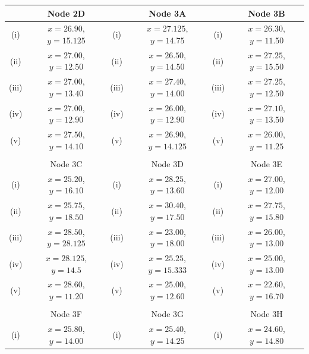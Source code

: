 \documentclass[12pt]{article}
\begin{document}
								\begin{tabular}{||c|c||c|c||c|c||}
								
					
					\hline  & Node 2D &   & Node 3A &  & Node 3B   \\  \hline
					\hline (i) & $x= 26.90$, $y= 15.125$ &  (i) & $x= 27.125$, $y= 14.75$  & (i)  & $x= 26.30$, $y= 11.50$\\  \hline
					\hline (ii)  & $x= 27.00$, $y= 12.50$  &  (ii) & $x= 26.50$, $y= 14.50$ & (ii) & $x= 27.25$, $y = 15.50$ \\  \hline
					\hline (iii) & $x= 27.00$, $y = 13.40$  & (iii) & $x= 27.40$, $y =14.00 $ &(iii) & $x= 27.25$, $y= 12.50$ \\  \hline
					\hline (iv)  & $x= 27.00$, $y= 12.90$  & (iv) & $x= 26.00$, $y = 12.90$ & (iv)  & $x= 27.10$, $y= 13.50$\\  \hline
					\hline (v) & $x= 27.50$, $y= 14.10$ & (v) & $x= 26.90$, $y= 14.125 $  &(v) & $x= 26.00$, $y= 11.25$\\  \hline & & & & & \\
					\hline 
					\hline  & Node 3C &   & Node 3D &  & Node 3E  \\  \hline
					\hline (i) & $x= 25.20$, $y = 16.10$ &  (i) & $x= 28.25$, $y = 13.60$  & (i)  & $x= 27.00$, $y = 12.00$\\  \hline
					\hline (ii) & $x= 25.75$, $y= 18.50$  & (ii) & $x= 30.40$, $y =17.50 $ &(ii) & $x= 27.75$, $y = 15.80$ \\  \hline
					\hline (iii)  & $x= 28.50$, $y= 28.125$  & (iii) & $x= 23.00$, $y = 18.00$ & (iii)  & $x= 26.00$, $y = 13.00$\\  \hline
					\hline (iv)  & $x= 28.125$, $y= 14.5$  &  (iv) & $x= 25.25$, $y = 15.333$ & (iv) & $x= 25.00$, $y = 13.00$ \\  \hline
					\hline (v) & $x= 28.60$, $y= 11.20$ & (v) & $x= 25.00 $, $y = 12.60$  &(v) & $x= 22.60$, $y = 16.70$\\  \hline & & & & & \\
					\hline 
					\hline  &  Node 3F &  & Node 3G &   & Node 3H \\  \hline
					\hline (i) & $x= 25.80$, $y= 14.00$ & (i) & $x= 25.40$, $y = 14.25$  & (i)  & $x= 24.60$, $y= 14.80$\\  \hline

\end{tabular}
\end{document}
